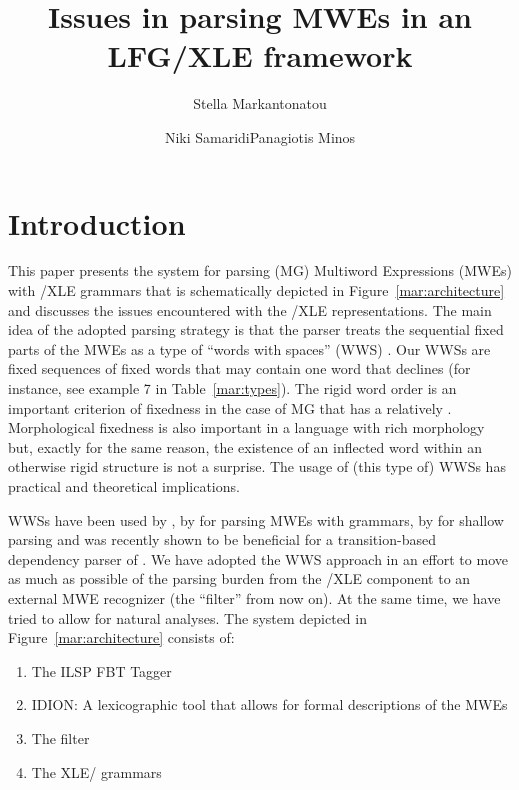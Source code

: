 \documentclass[output=paper]{langsci/langscibook}
\title{Issues in parsing MWEs in an LFG/XLE framework}
\author{Stella Markantonatou\affiliation{Institute for Language and Speech Processing / Athena RIC}\and Niki Samaridi\affiliation{Institute for Language and Speech Processing / Athena RIC}\lastand Panagiotis Minos\affiliation{Institute for Language and Speech Processing / Athena RIC}}
\begin{document}
\maketitle

\section{Introduction} 
This paper presents the system for parsing  (MG) Multiword Expressions (MWEs) with /XLE grammars that is schematically depicted in Figure~\ref{mar:architecture} and discusses the issues encountered with the /XLE representations. The main idea of the adopted parsing strategy is that the parser treats the sequential fixed parts of the MWEs as a type of ``words with spaces” (WWS) \citep{sag02}. Our  WWSs are fixed sequences of fixed words that may contain one word that declines (for instance, see example 7 in Table~\ref{mar:types}). The rigid word order is an important criterion of fixedness in the case of MG that has a relatively . Morphological fixedness is also important in a language with rich morphology but, exactly for the same reason, the existence of an inflected word within an otherwise rigid structure is not a surprise. The usage of (this type of) WWSs has practical and theoretical implications. 

WWSs have been used by \cite{copestakeetal2002}, by \cite{attia2006} for parsing  MWEs with  grammars, by \cite{korkontzelosetal2010} for shallow parsing and was recently shown to be beneficial for a transition-based dependency  parser of  \citep{apidianaki2018}. We have adopted the WWS approach in an effort to move as much as possible of the parsing burden from the /XLE component to an external MWE recognizer (the ``filter'' from now on). At the same time, we have tried to allow for natural  analyses. 
The system depicted in Figure~\ref{mar:architecture} consists of:
\begin{enumerate}
\item The ILSP FBT Tagger
\item IDION:  A lexicographic tool that allows for formal descriptions of the MWEs 
\item The filter
\item The XLE/ grammars
\end{enumerate}

\vspace{-.5cm}
\end{document}
